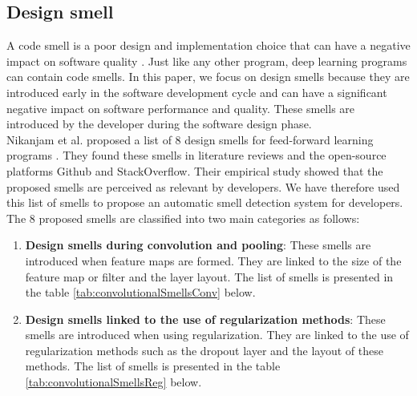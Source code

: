 \subsection{Design smell}
\label{sec:codeSmell}
A code smell is a poor design and implementation choice that can have a negative impact on software quality \cite{fowler1997refactoring}. Just like any other program, deep learning programs can contain code smells. In this paper, we focus on design smells because they are introduced early in the software development cycle and can have a significant negative impact on software performance and quality. These smells are introduced by the developer during the software design phase.\\ Nikanjam et al. proposed a list of 8 design smells for feed-forward learning programs \cite{nikanjam2021design}. They found these smells in literature reviews and the open-source platforms Github and StackOverflow. Their empirical study showed that the proposed smells are perceived as relevant by developers. We have therefore used this list of smells to propose an automatic smell detection system for developers.\\ The 8 proposed smells are classified into two main categories as follows:
\begin{enumerate}
    \item \textbf{Design smells during convolution and pooling}: These smells are
          introduced when feature maps are formed. They are linked to the size of the
          feature map or filter and the layer layout. The list of smells is presented in
          the table \ref{tab:convolutionalSmellsConv} below.
    \item \textbf{Design smells linked to the use of regularization methods}: These
          smells are introduced when using regularization. They are linked to the use of
          regularization methods such as the dropout layer and the layout of these
          methods. The list of smells is presented in the table
          \ref{tab:convolutionalSmellsReg} below.
\end{enumerate}


